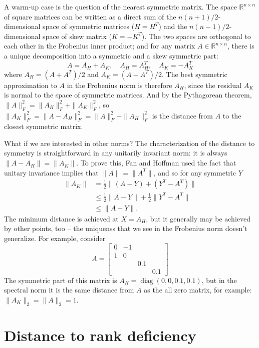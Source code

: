 \documentclass[12pt, leqno]{article} %
\begin{document}
A warm-up case is the question of the nearest symmetric matrix.
The space $\mathbb{R}^{n \times n}$ of square matrices can be written
as a direct sum of the $n(n+1)/2$-dimensional space of symmetric
matrices ($H=H^T$) and the $n(n-1)/2$-dimensional space of skew matrix
($K=-K^T$).  The two spaces are orthogonal to each other in the
Frobenius inner product; and
for any matrix $A \in \mathbb{R}^{n \times n}$, there is a unique
decomposition into a symmetric and a skew symmetric part:
\[
  A = A_H + A_K, \quad A_H = A_H^T, \quad A_K = -A_K^T
\]
where $A_H = (A+A^T)/2$ and $A_K = (A-A^T)/2$.  The best symmetric
approximation to $A$ in the Frobenius norm is therefore $A_H$, since
the residual $A_K$ is normal to the space of symmetric matrices.  And
by the Pythagorean theorem, $\|A\|_F^2 = \|A_H\|_F^2 + \|A_K\|_F^2$,
so $\|A_K\|_F^2 = \|A-A_H\|_F^2 = \|A\|_F^2 - \|A_H\|_F^2$ is the
distance from $A$ to the closest symmetric matrix.

What if we are interested in other norms?  The characterization of the
distance to symmetry is straightforward in any unitarily invariant
norm: it is always $\|A-A_H\| = \|A_K\|$.  To prove this, Fan and
Hoffman used the
fact that unitary invariance implies that $\|A\| = \|A^T\|$, and
so for any symmetric $Y$
\begin{align*}
  \|A_K\|
  &= \frac{1}{2} \|(A-Y) + (Y^T-A^T)\| \\
  &\leq \frac{1}{2} \|A-Y\| + \frac{1}{2} \|Y^T-A^T\| \\
  & \leq \|A-Y\|.
\end{align*}
The minimum distance is achieved at $X = A_H$, but it generally may be
achieved by other points, too -- the uniquenss that we see in the
Frobenius norm doesn't generalize.  For example, consider
\[
A =
\begin{bmatrix}
  0 & -1 \\
  1 & 0 \\
  & & 0.1 \\
  & & & 0.1
\end{bmatrix}
\]
The symmetric part of this matrix is
$A_H = \operatorname{diag}(0, 0, 0.1, 0.1)$, but in the spectral norm
it is the same distance from $A$ as the all zero matrix, for example:
$\|A_K\|_2 = \|A\|_2 = 1$.

\section{Distance to rank deficiency}
\end{document}
